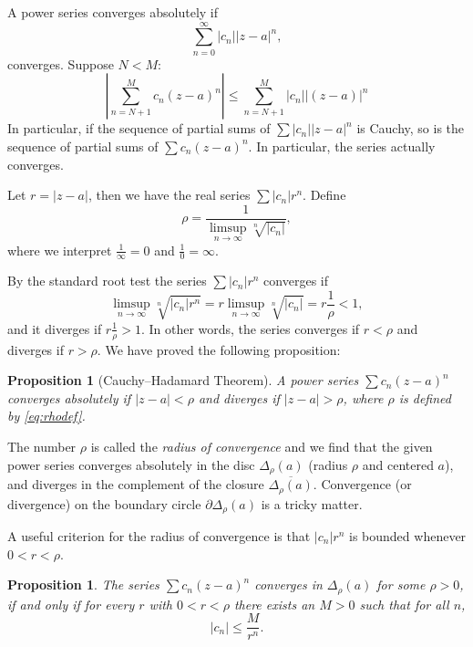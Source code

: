 \documentclass[12pt,openany]{book}
\newcommand{\sabs}[1]{\lvert {#1} \rvert}
\newcommand{\abs}[1]{\left\lvert {#1} \right\rvert}
\newcommand{\myindex}[1]{#1\index{#1}}
\theoremstyle{plain}
\newtheorem{prop}[thm]{Proposition}
\theoremstyle{remark}
\theoremstyle{definition}
\theoremstyle{exercise}
\theoremstyle{example}
\begin{document}
A power series converges absolutely if
\begin{equation*}
\sum_{n=0}^\infty \sabs{c_n} \sabs{z-a}^n ,
\end{equation*}
converges.  Suppose $N < M$:
\begin{equation*}
\abs{\sum_{n=N+1}^M c_n {(z-a)}^n}
\leq
\sum_{n=N+1}^M \sabs{c_n} \sabs{(z-a)}^n
\end{equation*}
In particular, if the sequence of partial sums of 
$\sum \sabs{c_n} \sabs{z-a}^n$ is Cauchy, so is the sequence
of partial sums of $\sum c_n {(z-a)}^n$.  In particular,
the series actually converges.

Let $r = \sabs{z-a}$, then we have the real series $\sum \sabs{c_n} r^n$.  Define
\begin{equation} \label{eq:rhodef}
\rho = \frac{1}{\limsup\limits_{n \to \infty} \sqrt[n]{\sabs{c_n}}} ,
\end{equation}
where we interpret $\frac{1}{\infty} = 0$ and $\frac{1}{0} = \infty$.

By the standard root test the series $\sum \sabs{c_n} r^n$
converges if
\begin{equation*}
\limsup_{n \to \infty} \sqrt[n]{\sabs{c_n} r^n} = 
r \limsup_{n \to \infty} \sqrt[n]{\sabs{c_n}} = r \frac{1}{\rho} < 1 ,
\end{equation*}
and it diverges if $r \frac{1}{\rho} > 1$.  In other words,
the series converges if
$r < \rho$
and diverges if
$r > \rho$.  We have proved the following proposition:

\begin{prop}[Cauchy--Hadamard Theorem]
A power series $\sum c_n {(z-a)}^n$ converges absolutely if
$\sabs{z-a} < \rho$ and diverges if
$\sabs{z-a} > \rho$, where $\rho$ is defined by \eqref{eq:rhodef}.
\end{prop}

The number $\rho$ is called the \emph{\myindex{radius of convergence}}
and we find that the given power series converges absolutely
in the disc $\Delta_\rho(a)$ (radius $\rho$ and centered $a$), and diverges
in the complement of the closure $\overline{\Delta_\rho(a)}$.
Convergence (or divergence) on the boundary circle $\partial \Delta_\rho(a)$
is a tricky matter.

A useful criterion for the radius of convergence is that $\sabs{c_n} r^n$ is
bounded whenever $0 < r < \rho$.

\begin{prop}
The series $\sum c_n {(z-a)}^n$ converges in $\Delta_{\rho}(a)$ for some
$\rho > 0$, if and only if
for every $r$ with
$0 < r < \rho$ there exists an $M > 0$ such that for all $n$,
\begin{equation*}
\sabs{c_n} \leq \frac{M}{r^n} .
\end{equation*}
\end{prop}
\end{document}

